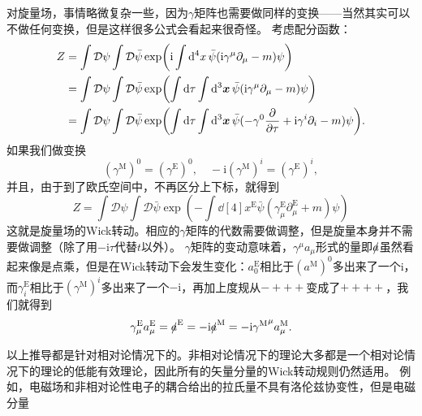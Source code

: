 \documentclass[hyperref, UTF8, a4paper]{ctexart}
\newcommand*{\ii}{\mathrm{i}}
\newcommand*{\fd}[1]{\mathcal{D} #1}
\begin{document}
对旋量场，事情略微复杂一些，因为$\gamma$矩阵也需要做同样的变换——当然其实可以不做任何变换，但是这样很多公式会看起来很奇怪。
考虑配分函数：
\[
    \begin{aligned}
        Z &= \int \fd{\psi} \int \fd{\bar{\psi}} \exp(\ii \int \dd[4]{x} \bar{\psi} (\ii \gamma^\mu \partial_\mu - m) \psi) \\
        &= \int \fd{\psi} \int \fd{\bar{\psi}} \exp(\int \dd{\tau} \int \dd[3]{\vb*{x}} \bar{\psi} (\ii \gamma^\mu \partial_\mu - m) \psi) \\
        &= \int \fd{\psi} \int \fd{\bar{\psi}} \exp(\int \dd{\tau} \int \dd[3]{\vb*{x}} \bar{\psi} (- \gamma^0 \pdv{\tau} + \ii \gamma^i \partial_i - m) \psi).
    \end{aligned}
\]
如果我们做变换
\begin{equation}
    (\gamma^\text{M})^0 = (\gamma^\text{E})^0, \quad - \ii (\gamma^\text{M})^i = (\gamma^\text{E})^i,
\end{equation}
并且，由于到了欧氏空间中，不再区分上下标，就得到
\begin{equation}
    Z = \int \fd{\psi} \int \fd{\bar{\psi}} \exp(- \int \dd[4]{x^\text{E}} \bar{\psi} (\gamma^\text{E}_\mu \partial_\mu^\text{E} + m) \psi)
\end{equation}
这就是旋量场的Wick转动。相应的$\gamma$矩阵的代数需要做调整，但是旋量本身并不需要做调整（除了用$-\ii \tau$代替$t$以外）。
$\gamma$矩阵的变动意味着，$\gamma^\mu a_\mu$形式的量即$\slashed{a}$虽然看起来像是点乘，但是在Wick转动下会发生变化：$a_0^\text{E}$相比于$(a^\text{M})^0$多出来了一个$\ii$，而$\gamma_i^\text{E}$相比于$(\gamma^\text{M})^i$多出来了一个$-\ii$，再加上度规从$-+++$变成了$++++$，我们就得到
\begin{equation}
    \gamma^\text{E}_\mu a^\text{E}_\mu = \slashed{a}^\text{E} = - \ii \slashed{a}^\text{M} = -\ii {\gamma^\text{M}}^\mu a^\text{M}_\mu.
\end{equation}

以上推导都是针对相对论情况下的。非相对论情况下的理论大多都是一个相对论情况下的理论的低能有效理论，因此所有的矢量分量的Wick转动规则仍然适用。
例如，电磁场和非相对论性电子的耦合给出的拉氏量不具有洛伦兹协变性，但是电磁分量
\end{document}
